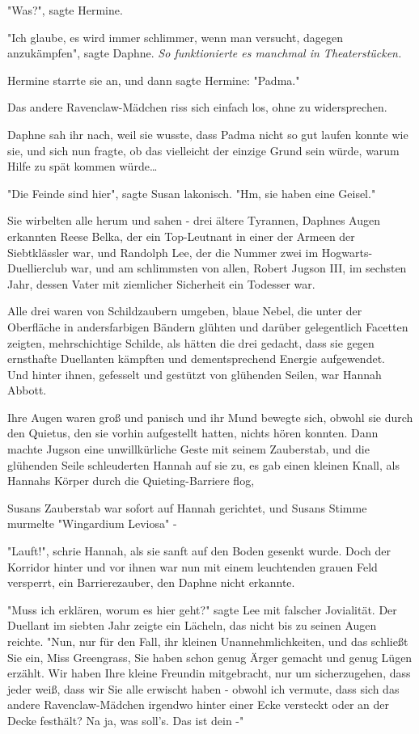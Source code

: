 {"Was?", sagte Hermine.

"Ich glaube, es wird immer schlimmer, wenn man versucht, dagegen anzukämpfen", sagte Daphne. \emph{So funktionierte es manchmal in Theaterstücken.}

Hermine starrte sie an, und dann sagte Hermine: "Padma."

Das andere Ravenclaw-Mädchen riss sich einfach los, ohne zu widersprechen.

Daphne sah ihr nach, weil sie wusste, dass Padma nicht so gut laufen konnte wie sie, und sich nun fragte, ob das vielleicht der einzige Grund sein würde, warum Hilfe zu spät kommen würde…

"Die Feinde sind hier", sagte Susan lakonisch. "Hm, sie haben eine Geisel."

Sie wirbelten alle herum und sahen - drei ältere Tyrannen, Daphnes Augen erkannten Reese Belka, der ein Top-Leutnant in einer der Armeen der Siebtklässler war, und Randolph Lee, der die Nummer zwei im Hogwarts-Duellierclub war, und am schlimmsten von allen, Robert Jugson III, im sechsten Jahr, dessen Vater mit ziemlicher Sicherheit ein Todesser war.

Alle drei waren von Schildzaubern umgeben, blaue Nebel, die unter der Oberfläche in andersfarbigen Bändern glühten und darüber gelegentlich Facetten zeigten, mehrschichtige Schilde, als hätten die drei gedacht, dass sie gegen ernsthafte Duellanten kämpften und dementsprechend Energie aufgewendet.\\ Und hinter ihnen, gefesselt und gestützt von glühenden Seilen, war Hannah Abbott.

Ihre Augen waren groß und panisch und ihr Mund bewegte sich, obwohl sie durch den Quietus, den sie vorhin aufgestellt hatten, nichts hören konnten. Dann machte Jugson eine unwillkürliche Geste mit seinem Zauberstab, und die glühenden Seile schleuderten Hannah auf sie zu, es gab einen kleinen Knall, als Hannahs Körper durch die Quieting-Barriere flog,

Susans Zauberstab war sofort auf Hannah gerichtet, und Susans Stimme murmelte "Wingardium Leviosa" -

"Lauft!", schrie Hannah, als sie sanft auf den Boden gesenkt wurde. Doch der Korridor hinter und vor ihnen war nun mit einem leuchtenden grauen Feld versperrt, ein Barrierezauber, den Daphne nicht erkannte.

"Muss ich erklären, worum es hier geht?" sagte Lee mit falscher Jovialität. Der Duellant im siebten Jahr zeigte ein Lächeln, das nicht bis zu seinen Augen reichte. "Nun, nur für den Fall, ihr kleinen Unannehmlichkeiten, und das schließt Sie ein, Miss Greengrass, Sie haben schon genug Ärger gemacht und genug Lügen erzählt. Wir haben Ihre kleine Freundin mitgebracht, nur um sicherzugehen, dass jeder weiß, dass wir Sie alle erwischt haben - obwohl ich vermute, dass sich das andere Ravenclaw-Mädchen irgendwo hinter einer Ecke versteckt oder an der Decke festhält? Na ja, was soll's. Das ist dein -"

}
